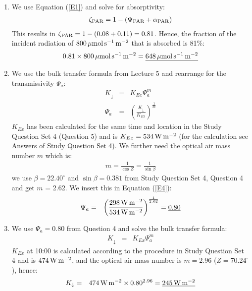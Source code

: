 \documentclass[11pt]{article}
\begin{document}
\begin{enumerate}
\item We use Equation (\ref{E1}) and solve for absorptivity:
\begin{eqnarray}
\zeta_{\rm{PAR}} = 1 - (\Psi_{\rm{PAR}} + \alpha_{\rm{PAR}})
\label{E3}
\end{eqnarray}
This results in $\zeta_{\rm{PAR}} = 1 - (0.08 + 0.11) = 0.81$. Hence, the fraction of the incident radiation of $800\,\mu \rm{mol}\,\rm{s}^{-1}\,\rm{m}^{-2}$ that is absorbed is 81\%:
\begin{eqnarray*}
0.81 \times 800\,\mu \rm{mol}\,\rm{s}^{-1}\,\rm{m}^{-2} = \underline{648\,\mu \rm{mol}\,\rm{s}^{-1}\,\rm{m}^{-2}}
\end{eqnarray*}

\item We use the bulk transfer formula from Lecture 5 and rearrange for the transmissivity $\Psi_a$:
\begin{eqnarray}
K_{\downarrow} &=& K_{Ex} \Psi_a^m \\
\Psi_a &=& \left( \frac{K_{\downarrow}}{K_{Ex}} \right) ^{\frac{1}{m}}
\label{E4}
\end{eqnarray}
$K_{Ex}$ has been calculated for the same time and location in the Study Question Set 4 (Question 5) and is $K_{Ex} = 534 \,\rm{W}\,\rm{m}^{-2}$ (for the calculation see Answers of Study Question Set 4). We further need the optical air mass number $m$ which is:
\begin{eqnarray}
m = \frac{1}{\cos Z} = \frac{1}{\sin \beta}
\end{eqnarray}
we use $\beta = 22.40^{\circ}$ and $\sin \beta = 0.381$ from Study Question Set 4, Question 4 and get $m$ = 2.62. We insert this in Equation (\ref{E4}):
\begin{eqnarray}
\Psi_a &=& \left( \frac{298\,\rm{W}\,\rm{m}^{-2}}{534\,\rm{W}\,\rm{m}^{-2}} \right) ^{\frac{1}{2.62}} = \underline{0.80}
\end{eqnarray}

\item We use  $\Psi_a = 0.80$ from Question 4 and solve the bulk transfer formula:
\begin{eqnarray}
K_{\downarrow} &=& K_{Ex} \Psi_a^m
\end{eqnarray}
$K_{Ex}$ at 10:00 is calculated according to the procedure in Study Question Set 4 and is $474 \,\rm{W}\,\rm{m}^{-2}$, and the optical air mass number is $m = 2.96$ ($Z = 70.24^{\circ}$), hence:
\begin{eqnarray}
K_{\downarrow} &=& 474 \,\rm{W}\,\rm{m}^{-2} \times 0.80^{2.96} = \underline{245 \,\rm{W}\,\rm{m}^{-2}}
\end{eqnarray}
\end{enumerate}
\end{document}
